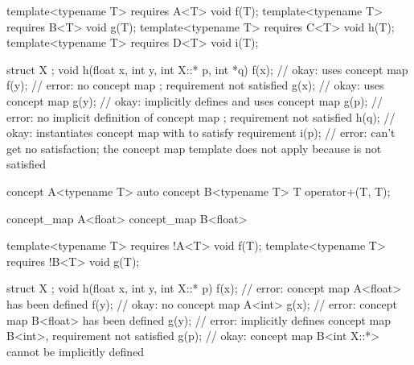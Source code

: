 \documentclass[american]{book}
\begin{document}
\begin{paras}
\begin{codeblock}
template<typename T> requires A<T> void f(T);
template<typename T> requires B<T> void g(T);
template<typename T> requires C<T> void h(T);
template<typename T> requires D<T> void i(T);

struct X { };
void h(float x, int y, int X::* p, int *q) {
  f(x); // okay: uses concept map 
  f(y); // error: no concept map ; requirement not satisfied
  g(x); // okay: uses concept map 
  g(y); // okay: implicitly defines and uses concept map 
  g(p); // error: no implicit definition of concept map ; requirement not satisfied
  h(q); // okay: instantiates concept map  with  to satisfy requirement 
  i(p); // error:  can't get no satisfaction; the concept map template  does not apply because  is not satisfied
}
\end{codeblock}
\addedConcepts{\mbox{\exitexample}}

\pnum 
{}
\addedConcepts{\mbox{\enterexample}}
\begin{codeblock}
concept A<typename T> { }
auto concept B<typename T> { T operator+(T, T); }

concept_map A<float> { }
concept_map B<float> { }

template<typename T> requires !A<T> void f(T);
template<typename T> requires !B<T> void g(T);

struct X { };
void h(float x, int y, int X::* p) {
  f(x); // error: concept map A<float> has been defined
  f(y); // okay: no concept map A<int>
  g(x); // error: concept map B<float> has been defined
  g(y); // error: implicitly defines concept map B<int>, requirement not satisfied
  g(p); // okay: concept map B<int X::*> cannot be implicitly defined
}
\end{codeblock}
\addedConcepts{\mbox{\exitexample}}

\pnum
{}


\end{paras}
\end{document}
